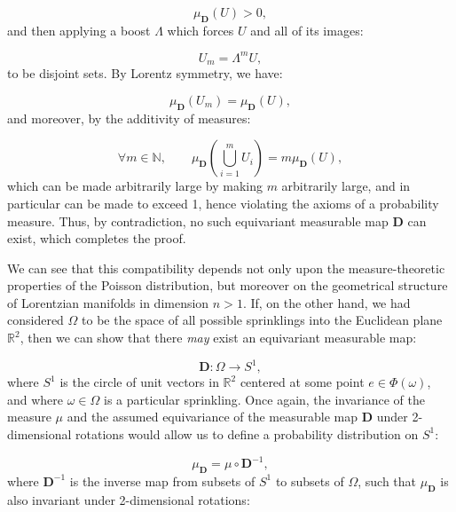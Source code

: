 \documentclass{article}
\begin{document}
\begin{equation}
\mu_{\mathbf{D}} \left( U \right) > 0,
\end{equation}
and then applying a boost ${\Lambda}$ which forces $U$ and all of its images:

\begin{equation}
U_m = \Lambda^{m} U,
\end{equation}
to be disjoint sets. By Lorentz symmetry, we have:

\begin{equation}
\mu_{\mathbf{D}} \left( U_m \right) = \mu_{\mathbf{D}} \left( U \right),
\end{equation}
and moreover, by the additivity of measures:

\begin{equation}
\forall m \in \mathbb{N}, \qquad \mu_{\mathbf{D}} \left( \bigcup_{i =  1}^{m} U_i \right) = m \mu_{\mathbf{D}} \left( U \right),
\end{equation}
which can be made arbitrarily large by making $m$ arbitrarily large, and in particular can be made to exceed 1, hence violating the axioms of a probability measure. Thus, by contradiction, no such equivariant measurable map ${\mathbf{D}}$ can exist, which completes the proof.

We can see that this compatibility depends not only upon the measure-theoretic properties of the Poisson distribution, but moreover on the geometrical structure of Lorentzian manifolds in dimension ${n > 1}$. If, on the other hand, we had considered ${\Omega}$ to be the space of all possible sprinklings into the Euclidean plane ${\mathbb{R}^2}$, then we can show that there \textit{may} exist an equivariant measurable map:

\begin{equation}
\mathbf{D} : \Omega \to S^1,
\end{equation}
where ${S^1}$ is the circle of unit vectors in ${\mathbb{R}^2}$ centered at some point ${e \in \Phi \left( \omega \right)}$, and where ${\omega \in \Omega}$ is a particular sprinkling. Once again, the invariance of the measure ${\mu}$ and the assumed equivariance of the measurable map ${\mathbf{D}}$ under 2-dimensional rotations would allow us to define a probability distribution on ${S^1}$:

\begin{equation}
\mu_{\mathbf{D}} = \mu \circ \mathbf{D}^{-1},
\end{equation}
where ${\mathbf{D}^{-1}}$ is the inverse map from subsets of ${S^1}$ to subsets of ${\Omega}$, such that ${\mu_{\mathbf{D}}}$ is also invariant under 2-dimensional rotations:
\end{document}
